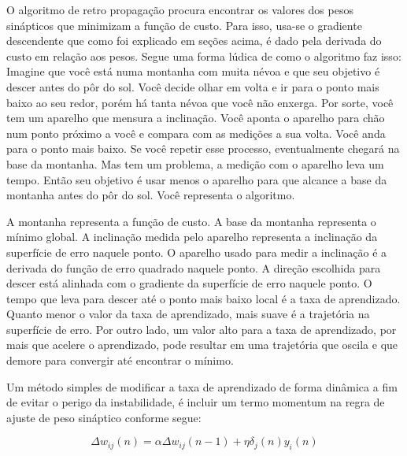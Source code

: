 O algoritmo de retro propagação procura encontrar os valores dos pesos sinápticos que minimizam a função de custo. Para isso, usa-se o gradiente descendente que como foi explicado em seções acima, é dado pela derivada do custo em relação aos pesos. Segue uma forma lúdica de como o algoritmo faz isso: Imagine que você está numa montanha com muita névoa e que seu objetivo é descer antes do pôr do sol.
Você decide olhar em volta e ir para o ponto mais baixo ao seu redor, porém há tanta névoa que você não enxerga. Por sorte, você tem um aparelho  que mensura a inclinação. Você aponta o aparelho para chão num ponto próximo a você e compara com as medições a sua volta.
Você anda para o ponto mais baixo. Se você repetir esse processo, eventualmente chegará na base da montanha. Mas tem um problema, a medição com o aparelho leva um tempo. Então seu objetivo é usar menos o aparelho para que alcance a base da montanha antes do pôr do sol. 
Você representa o algoritmo. 

A montanha representa a função de custo. A base da montanha representa o mínimo global. A inclinação medida pelo aparelho representa a inclinação da superfície de erro naquele ponto. O aparelho usado para medir a inclinação é a derivada do função de erro quadrado naquele ponto. A direção escolhida para descer está alinhada com o gradiente da superfície de erro naquele ponto. O tempo que leva para descer até o ponto mais baixo local é a taxa de aprendizado.
Quanto menor o valor da taxa de aprendizado, mais suave é a trajetória na superfície de erro. Por outro lado, um valor alto para a taxa de aprendizado, por mais que acelere o aprendizado, pode resultar em uma trajetória que oscila e que demore para convergir até encontrar o mínimo.

Um método simples de modificar a taxa de aprendizado de forma dinâmica a fim de evitar o perigo da instabilidade, é incluir um termo momentum na regra de ajuste de peso sináptico conforme segue:

\begin{equation}
\Delta w_{ij}(n) = \alpha \Delta w_{ij}(n-1) + \eta \delta_j(n)y_i(n)
\end{equation}

